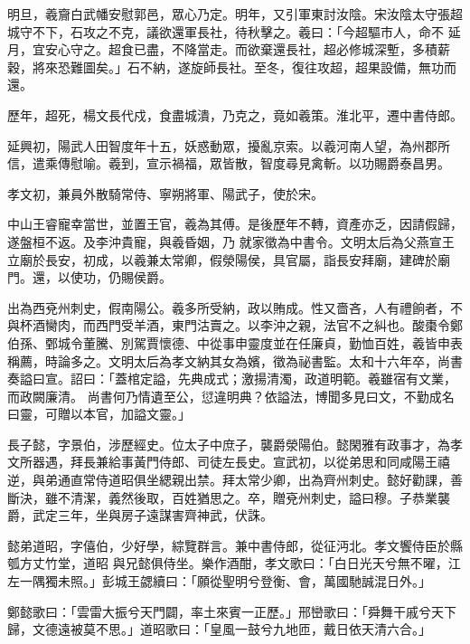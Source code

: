 \begin{pinyinscope}
 明旦，羲齎白武幡安慰郭邑，眾心乃定。明年，又引軍東討汝陰。宋汝陰太守張超城守不下，石攻之不克，議欲還軍長社，待秋擊之。羲曰：「今超驅市人，命不
 延月，宜安心守之。超食已盡，不降當走。而欲棄還長社，超必修城深塹，多積薪穀，將來恐難圖矣。」石不納，遂旋師長社。至冬，復往攻超，超果設備，無功而還。



 歷年，超死，楊文長代戍，食盡城潰，乃克之，竟如羲策。淮北平，遷中書侍郎。



 延興初，陽武人田智度年十五，妖惑動眾，擾亂京索。以羲河南人望，為州郡所信，遣乘傳慰喻。羲到，宣示禍福，眾皆散，智度尋見禽斬。以功賜爵泰昌男。



 孝文初，兼員外散騎常侍、寧朔將軍、陽武子，使於宋。



 中山王睿寵幸當世，並置王官，羲為其傅。是後歷年不轉，資產亦乏，因請假歸，遂盤桓不返。及李沖貴寵，與羲昏姻，乃
 就家徵為中書令。文明太后為父燕宣王立廟於長安，初成，以羲兼太常卿，假滎陽侯，具官屬，詣長安拜廟，建碑於廟門。還，以使功，仍賜侯爵。



 出為西兗州刺史，假南陽公。羲多所受納，政以賄成。性又嗇吝，人有禮餉者，不與杯酒臠肉，而西門受羊酒，東門沽賣之。以李沖之親，法官不之糾也。酸棗令鄭伯孫、鄄城令董騰、別駕賈懷德、中從事申靈度並在任廉貞，勤恤百姓，羲皆申表稱薦，時論多之。文明太后為孝文納其女為嬪，徵為祕書監。太和十六年卒，尚書奏謚曰宣。詔曰：「蓋棺定謚，先典成式；激揚清濁，政道明範。羲雖宿有文業，而政闕廉清。
 尚書何乃情遺至公，愆違明典？依謚法，博聞多見曰文，不勤成名曰靈，可贈以本官，加謚文靈。」



 長子懿，字景伯，涉歷經史。位太子中庶子，襲爵滎陽伯。懿閑雅有政事才，為孝文所器遇，拜長兼給事黃門侍郎、司徒左長史。宣武初，以從弟思和同咸陽王禧逆，與弟通直常侍道昭俱坐緦親出禁。拜太常少卿，出為齊州刺史。懿好勸課，善斷決，雖不清潔，義然後取，百姓猶思之。卒，贈兗州刺史，謚曰穆。子恭業襲爵，武定三年，坐與房子遠謀害齊神武，伏誅。



 懿弟道昭，字僖伯，少好學，綜覽群言。兼中書侍郎，從征沔北。孝文饗侍臣於縣瓠方丈竹堂，道昭
 與兄懿俱侍坐。樂作酒酣，孝文歌曰：「白日光天兮無不曜，江左一隅獨未照。」彭城王勰續曰：「願從聖明兮登衡、會，萬國馳誠混日外。」



 鄭懿歌曰：「雲雷大振兮天門闢，率土來賓一正歷。」邢巒歌曰：「舜舞干戚兮天下歸，文德遠被莫不思。」道昭歌曰：「皇風一鼓兮九地匝，戴日依天清六合。」




\end{pinyinscope}
